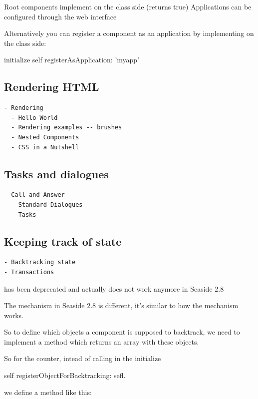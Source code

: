 \documentclass[a4paper,10pt,twoside]{book}
\begin{document}
Root components implement  on the class side (returns true)
Applications can be configured through the web interface

Alternatively you can register a component as an application by implementing  on the class side:
\begin{code}
initialize
	self registerAsApplication: 'myapp'
\end{code}


\subsection{Rendering HTML}
\begin{verbatim}
- Rendering
  - Hello World
  - Rendering examples -- brushes
  - Nested Components
  - CSS in a Nutshell
\end{verbatim}
\subsection{Tasks and dialogues}
\begin{verbatim}
- Call and Answer
  - Standard Dialogues
  - Tasks
\end{verbatim}
\subsection{Keeping track of state}
\begin{verbatim}
- Backtracking state
- Transactions
\end{verbatim}


 has been deprecated and actually does not work
anymore in Seaside 2.8


The mechanism in Seaside 2.8 is different, it's similar to how the  mechanism works.

So to define which objects a component is supposed to backtrack, we need to implement a method  which returns an array with these objects.

So for the counter, intead of calling in the initialize

\begin{code}
	self registerObjectForBacktracking: sefl.
\end{code}

we define a method  like this:
\end{document}
